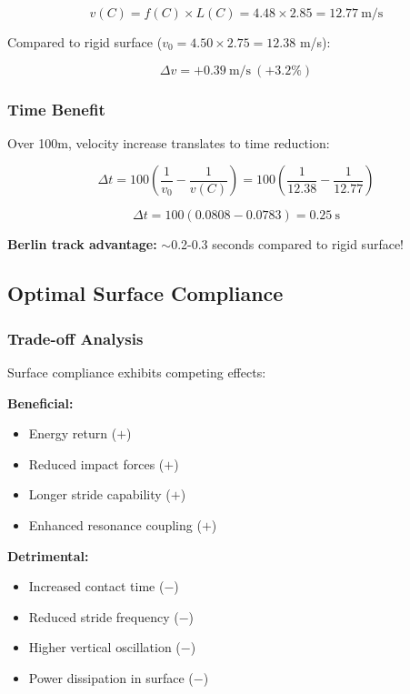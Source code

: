 \begin{equation}
v(C) = f(C) \times L(C) = 4.48 \times 2.85 = 12.77~\text{m/s}
\label{eq:velocity_with_compliance}
\end{equation}

Compared to rigid surface ($v_0 = 4.50 \times 2.75 = 12.38$ m/s):

\begin{equation}
\Delta v = +0.39~\text{m/s} ~(+3.2\%)
\label{eq:velocity_increase}
\end{equation}

\subsubsection{Time Benefit}

Over 100m, velocity increase translates to time reduction:

\begin{equation}
\Delta t = 100 \left(\frac{1}{v_0} - \frac{1}{v(C)}\right) = 100 \left(\frac{1}{12.38} - \frac{1}{12.77}\right)
\label{eq:time_benefit_calculation}
\end{equation}

\begin{equation}
\Delta t = 100 (0.0808 - 0.0783) = 0.25~\text{s}
\label{eq:time_benefit}
\end{equation}

\textbf{Berlin track advantage:} $\sim$0.2-0.3 seconds compared to rigid surface!

\subsection{Optimal Surface Compliance}

\subsubsection{Trade-off Analysis}

Surface compliance exhibits competing effects:

\textbf{Beneficial:}
\begin{itemize}
\item Energy return ($+$)
\item Reduced impact forces ($+$)
\item Longer stride capability ($+$)
\item Enhanced resonance coupling ($+$)
\end{itemize}

\textbf{Detrimental:}
\begin{itemize}
\item Increased contact time ($-$)
\item Reduced stride frequency ($-$)
\item Higher vertical oscillation ($-$)
\item Power dissipation in surface ($-$)
\end{itemize}

